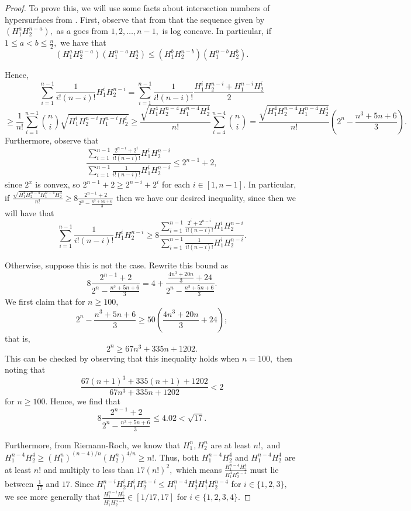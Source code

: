 \documentclass{article}
\theoremstyle{definition}
\theoremstyle{remark}
\begin{document}
\begin{proof}
\par To prove this, we will use some facts about intersection numbers of hypersurfaces from \cite{lazarsfeld}. First, observe that from \cite[Example 1.6.4]{lazarsfeld} that the sequence given by $(H_1^aH_2^{n-a}),$ as $a$ goes from $1, 2, \ldots, n-1,$ is log concave. In particular, if $1 \leq a < b \leq \frac{n}{2},$ we have that \[(H_1^aH_2^{n-a})(H_1^{n-a}H_2^a) \leq (H_1^bH_2^{n-b})(H_1^{n-b}H_2^b).\]
\par Hence, $$\sum\limits_{i=1}^{n-1} \frac{1}{i!(n-i)!}H_1^iH_2^{n-i} = \sum\limits_{i=1}^{n-1} \frac{1}{i!(n-i)!}\frac{H_1^iH_2^{n-i} + H_1^{n-i}H_2^i}{2}$$ $$\geq \frac{1}{n!} \sum\limits_{i=1}^{n-1} \binom{n}{i} \sqrt{H_1^iH_2^{n-i} H_1^{n-i}H_2^i} \geq \frac{\sqrt{H_1^4H_2^{n-4} H_1^{n-4}H_2^4}}{n!} \sum\limits_{i=4}^{n-4} \binom{n}{i} = \frac{\sqrt{H_1^4H_2^{n-4} H_1^{n-4}H_2^4}}{n!} \left(2^n - \frac{n^3 + 5n + 6}{3}\right).$$ Furthermore, observe that $$\frac{\sum\limits_{i=1}^{n-1} \frac{2^{n-i} + 2^i}{i!(n-i)!}H_1^iH_2^{n-i}}{\sum\limits_{i=1}^{n-1} \frac{1}{i!(n-i)!}H_1^iH_2^{n-i}} \leq 2^{n-1} + 2,$$ since $2^x$ is convex, so $2^{n-1} + 2 \geq 2^{n-i} + 2^i$ for each $i \in [1, n-1].$ In particular, if $\frac{\sqrt{H_1^4H_2^{n-4} H_1^{n-4}H_2^4}}{n!} \geq 8\frac{2^{n-1} + 2}{2^n - \frac{n^3 + 5n + 6}{3}}$ then we have our desired inequality, since then we will have that \[\sum\limits_{i=1}^{n-1} \frac{1}{i!(n-i)!}H_1^iH_2^{n-i} \geq 8 \frac{\sum\limits_{i=1}^{n-1} \frac{2^i + 2^{n-i}}{i!(n-i)!}H_1^iH_2^{n-i}}{\sum\limits_{i=1}^{n-1} \frac{1}{i!(n-i)!}H_1^iH_2^{n-i}}.\]
\par Otherwise, suppose this is not the case. Rewrite this bound as \[8\frac{2^{n-1} + 2}{2^n - \frac{n^3 + 5n + 6}{3}} = 4 + \frac{\frac{4n^3 + 20n}{3} + 24}{2^n - \frac{n^3 + 5n + 6}{3}}.\] We first claim that for $n \geq 100,$ \[2^n - \frac{n^3 + 5n + 6}{3} \geq 50(\frac{4n^3 + 20n}{3} + 24);\] that is, \[2^n \geq 67n^3 + 335n + 1202.\] This can be checked by observing that this inequality holds when $n = 100,$ then noting that \[\frac{67(n+1)^3 + 335(n+1) + 1202}{67n^3 + 335n + 1202} < 2\] for $n \geq 100.$ Hence, we find that \[8\frac{2^{n-1} + 2}{2^n - \frac{n^3 + 5n + 6}{3}} \leq 4.02 < \sqrt{17}.\] 
\par Furthermore, from Riemann-Roch, we know that $H_1^n, H_2^n$ are at least $n!,$ and $H_1^{n-4}H_2^4 \geq (H_1^n)^{(n-4)/n}(H_2^n)^{4/n} \geq n!.$ Thus, both $H_1^{n-4}H_2^4$ and $H_1^{n-4}H_2^4$ are at least $n!$ and multiply to less than $17(n!)^2,$ which means $\frac{H_1^{n-4}H_2^4}{H_1^4H_2^{n-4}}$ must lie between $\frac{1}{17}$ and $17.$ Since $H_1^{n-i}H_2^i H_1^i H_2^{n-i} \leq H_1^{n-4}H_2^4 H_1^4H_2^{n-4}$ for $i \in \{1, 2, 3\},$ we see more generally that $\frac{H_1^{n-i}H_2^i}{H_1^iH_2^{n-i}} \in [1/17, 17]$ for $i \in \{1, 2, 3, 4\}.$

\end{proof}
\end{document}
